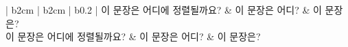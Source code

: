 \documentclass[12pt]{article}
\begin{document}
	
	\begin{tabular}{ | b{2cm} | b{2cm} | b{0.2\linewidth} | }
		\hline
		이 문장은 어디에 정렬될까요? & 이 문장은 어디? & 이 문장은? \\ 
		\hline
		이 문장은 어디에 정렬될까요? & 이 문장은 어디? & 이 문장은? \\		
		\hline
	\end{tabular}	
\end{document}
